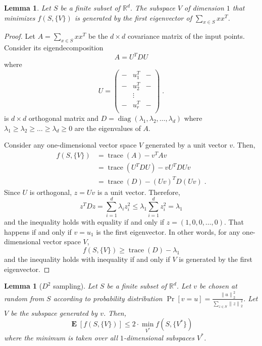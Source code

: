 \documentclass[12pt]{article}
\newtheorem{lemma}[theorem]{Lemma}
\newcommand{\R}{\mathbb{R}}
\newcommand{\norm}[1]{\left\|#1\right\|}
\DeclareMathOperator*{\diag}{diag}
\DeclareMathOperator*{\trace}{trace}
\DeclareMathOperator*{\Exp}{\mathbf{E}}
\begin{document}
\begin{lemma}
Let $S$ be a finite subset of $\R^d$.
The subspace $V$ of dimension $1$ that minimizes $f(S, \{V\})$ is generated
by the first eigenvector of $\sum_{x \in S} xx^T$.
\end{lemma}

\begin{proof}
Let $A = \sum_{x \in S} xx^T$ be the $d \times d$
covariance matrix of the input points. Consider its eigendecomposition
$$
A = U^T D U
$$
where
$$
U =
\begin{pmatrix}
- & u_1^T & - \\
- & u_2^T & - \\
  & \vdots & \\
- & u_r^T & - \\
\end{pmatrix} \; .
$$
is $d \times d$ orthogonal matrix and $D = \diag(\lambda_1,
\lambda_2, \dots, \lambda_d)$ where $\lambda_1 \ge \lambda_2 \ge \dots \ge
\lambda_d \ge 0$ are the eigenvalues of $A$.

Consider any one-dimensional vector space $V$ generated by a unit vector $v$.
Then,
\begin{align*}
f(S, \{V\})
& = \trace(A) - v^T A v \\
& = \trace(U^T D U) - v U^T D U v \\
& = \trace(D) - (Uv)^T D (Uv) \; .
\end{align*}
Since $U$ is orthogonal, $z=Uv$ is a unit vector. Therefore,
$$
z^T D z = \sum_{i=1}^d \lambda_i z_i^2 \le \lambda_1 \sum_{i=1}^d z_i^2 = \lambda_1
$$
and the inequality holds with equality if and only if $z=(1,0,0,\dots,0)$.
That happens if and only if $v=u_1$ is the first eigenvector.
In other words, for any one-dimensional vector space $V$,
$$
f(S, \{V\}) \ge \trace(D) - \lambda_1
$$
and the inequality holds with inequality if and only if $V$ is generated
by the first eigenvector.
\end{proof}

\begin{lemma}[$D^2$ sampling]
Let $S$ be a finite subset of $\R^d$. Let $v$ be chosen at random from $S$
according to probability distribution $\Pr[v = u] = \frac{\norm{u}_2^2}{\sum_{z \in S} \norm{z}_2^2}$.
Let $V$ be the subspace generated by $v$. Then,
$$
\Exp[f(S,\{V\})] \le 2 \cdot \min_{V^*} f(S, \{V^*\})
$$
where the minimum is taken over all $1$-dimensional subspaces $V^*$.
\end{lemma}
\end{document}
